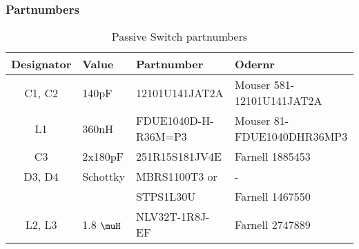 \documentclass{article}
\begin{document}
\subsubsection{Partnumbers}
\begin{table}[H]
    \centering
    \begin{tabular}{|c|l|l|l|}
        \hline
         Designator & Value & Partnumber & Odernr \\
         \hline
         C1, C2 & 140pF & 12101U141JAT2A & Mouser 581-12101U141JAT2A \\
         L1 & 360nH & FDUE1040D-H-R36M=P3 & Mouser 81-FDUE1040DHR36MP3 \\
         C3 & 2x180pF & 251R15S181JV4E & Farnell 1885453 \\
         D3, D4 & Schottky & MBRS1100T3 or & - \\
                &          & STPS1L30U & Farnell 1467550 \\
         L2, L3 & 1.8 $\muH$ & NLV32T-1R8J-EF & Farnell 2747889\\
        \hline         
    \end{tabular}
    \caption{Passive Switch partnumbers}
    \label{tab:ps-parts}
\end{table}
\end{document}
